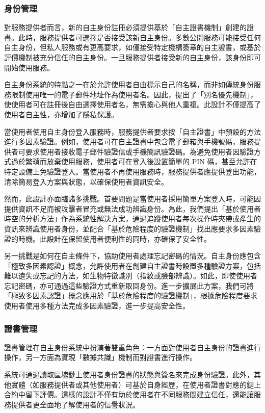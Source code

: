 \subsubsection{身份管理}
對服務提供者而言，新的自主身份註冊必須提供基於「自主證書機制」創建的證書。此時，服務提供者可選擇是否接受該新自主身份。多數公開服務可能接受任何自主身份，但私人服務或有更高要求，如僅接受特定機構簽章的自主證書，或基於評價機制被充分信任的自主身份。一旦服務提供者接受新的自主身份，該身份即可開始使用服務。

自主身份系統的特點之一在於允許使用者自由標示自己的名稱，而非如傳統身份服務限制使用唯一的電子郵件地址作為使用者名。因此，提出了「別名優先機制」，使使用者可在註冊後自由選擇使用者名，無需擔心與他人重複。此設計不僅提高了使用者自主性，亦增加了隱私保護。

當使用者使用自主身份登入服務時，服務提供者要求按「自主證書」中預設的方法進行多因素驗證。例如，使用者可在自主證書中包含電子郵箱與手機號碼，服務提供者可要求使用者接收電子郵件驗證信或手機簡訊驗證碼。為避免使用者因驗證方式過於繁瑣而放棄使用服務，使用者可在登入後設置簡單的 PIN 碼，甚至允許在特定設備上免驗證登入。當使用者不再使用服務時，服務提供者應提供登出功能，清除簡易登入方案與狀態，以確保使用者資訊安全。

然而，此設計亦面臨諸多挑戰。首要問題是當使用者採用簡單方案登入時，可能因提供資訊不足而被攻擊者冒充或無法成功辨識身份。為此，我們提出「基於使用者時空的分析方法」作為系統性解決方案，通過追蹤使用者每次操作時夾帶或產生的資訊來辨識使用者身份，並配合「基於危險程度的驗證機制」找出應要求多因素驗證的時機。此設計在保留使用者便利性的同時，亦確保了安全性。

另一挑戰是如何在自主條件下，協助使用者處理忘記密碼的情況。自主身份應包含「極致多因素認證」概念，允許使用者在創建自主證書時設置多種驗證方案，包括難以遺失或忘記的方法，如生物特徵識別（指紋或臉部辨識）。如此，即使使用者忘記密碼，亦可通過這些驗證方式重新取回身份。進一步擴展此方案，我們可將「極致多因素認證」概念應用於「基於危險程度的驗證機制」，根據危險程度要求使用者使用多種方法完成多因素驗證，進一步提高安全性。
\subsubsection{證書管理}
證書管理在自主身份系統中扮演著雙重角色：一方面對使用者自主身份的證書進行操作，另一方面為實現「數據共識」機制而對證書進行操作。

系統可通過讀取區塊鏈上使用者身份證書的狀態與簽名來完成身份驗證。此外，其他實體（如服務提供者或其他使用者）可基於自身經歷，在使用者證書對應的鏈上合約中留下評價。這樣的設計不僅有助於使用者在不同服務間建立信任，還能讓服務提供者更全面地了解使用者的信譽狀況。

